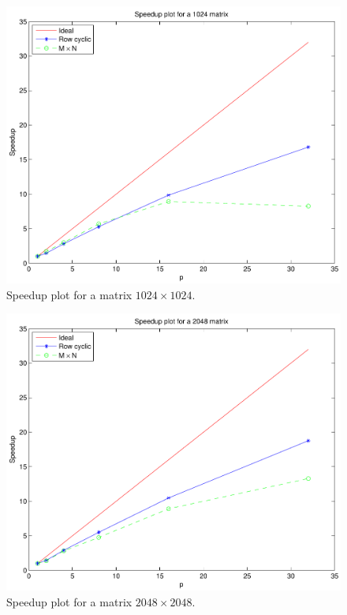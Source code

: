 \documentclass[a4paper,11pt]{article}
\begin{document}
\begin{figure}[H]
\begin{center}
 \includegraphics[scale=0.6]{img/1024.pdf}
\caption{Speedup plot for a matrix $1024 \times 1024$.}
\end{center}
\end{figure}

\begin{figure}[H]
\begin{center}
 \includegraphics[scale=0.6]{img/2048.pdf}
\caption{Speedup plot for a matrix $2048 \times 2048$.}
\end{center}
\end{figure}
\end{document}
